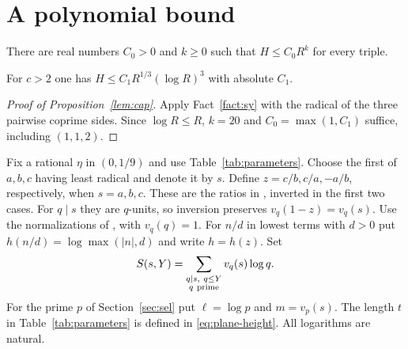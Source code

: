 \section{A polynomial bound}\label{sec:cap}
\begin{proposition}\label{lem:cap}
There are real numbers $C_0>0$ and $k\ge0$ such that $H\le C_0R^k$
for every triple.
\end{proposition}
\begin{fact}\label{fact:sy}
For $c>2$ one has $H\le C_1 R^{1/3}(\log R)^3$ with absolute $C_1$.
\end{fact}
\begin{proof}[Proof of Proposition~\ref{lem:cap}]
Apply Fact~\ref{fact:sy} with the radical of the three pairwise coprime sides.
Since $\log R\le R$, $k=20$ and $C_0=\max(1,C_1)$ suffice, including $(1,1,2)$.
\end{proof}

Fix a rational $\eta$ in $(0,1/9)$ and use Table~\ref{tab:parameters}.
Choose the first of $a,b,c$ having least radical and denote it by $s$.
Define $z=c/b,c/a,-a/b$, respectively, when $s=a,b,c$.
These are the ratios in \cite[(3.4)]{Zhang2026Third}, inverted in the first two cases.
For $q\mid s$ they are $q$-units, so inversion preserves $v_q(1-z)=v_q(s)$.
Use the normalizations of \cite[\S2]{Zhang2026Third}, with $v_q(q)=1$.
For $n/d$ in lowest terms with $d>0$ put
$h(n/d)=\log\max(|n|,d)$ and write $h=h(z)$.
Set
\[
  S(s,Y)=\sum_{\substack{q\mid s,\ q\le Y\\q\ {\rm prime}}}v_q(s)\log q .
\]
For the prime $p$ of Section~\ref{sec:sel} put $\ell=\log p$ and $m=v_p(s)$.
The length $t$ in Table~\ref{tab:parameters} is defined in
\eqref{eq:plane-height}. All logarithms are natural.
\parameters
